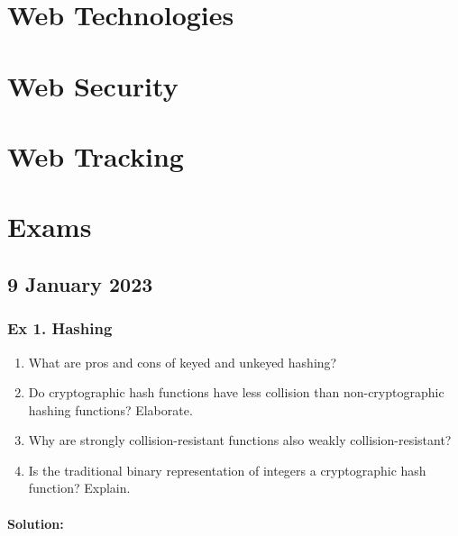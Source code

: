 	\newpage
	\section{Web Technologies}	
	
	\newpage
	\section{Web Security}	
	
	\newpage
	\section{Web Tracking}	
		
	\newpage
	\section{Exams}	
	\subsection{9 January 2023}	
	\subsubsection{Ex 1. Hashing}	
	\begin{enumerate}
	\item 	What are pros and cons of keyed and unkeyed hashing?
	\item 	Do cryptographic hash functions have less collision than non-cryptographic hashing functions? Elaborate.
	\item 	Why are strongly collision-resistant functions also weakly collision-resistant? 
	\item 	Is the traditional binary representation of integers a cryptographic hash function? Explain.
	\end{enumerate}
	
	\paragraph{Solution:}
	
